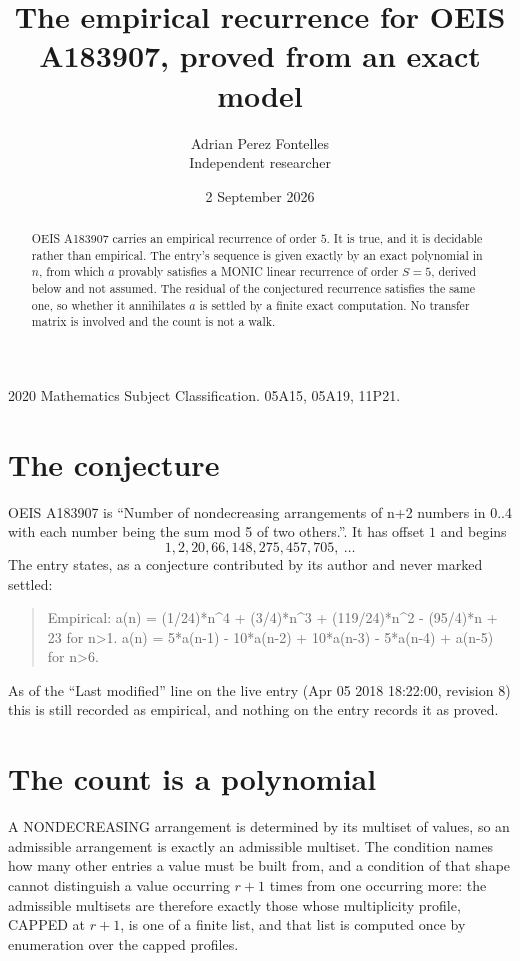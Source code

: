 \documentclass[11pt,a4paper]{article}
\title{The empirical recurrence for OEIS A183907, proved from an exact model}
\author{Adrian Perez Fontelles\\ \small Independent researcher}
\date{2 September 2026}
\theoremstyle{plain}
\theoremstyle{definition}
\begin{document}
\maketitle

\begin{abstract}
OEIS A183907 carries an empirical recurrence of order $5$. It is true, and it is
decidable rather than empirical. The entry's sequence is given exactly by an exact polynomial in $n$, from
which $a$ provably satisfies a MONIC linear recurrence of order $S=5$, derived below and not
assumed. The residual of the conjectured recurrence satisfies the same one, so whether it
annihilates $a$ is settled by a finite exact computation. No transfer matrix is involved and
the count is not a walk.
\end{abstract}

\noindent\small 2020 Mathematics Subject Classification. 05A15, 05A19, 11P21.\normalsize

\section{The conjecture}

OEIS A183907 is ``Number of nondecreasing arrangements of n+2 numbers in 0..4 with each number being the sum mod 5 of two others.''. It has offset $1$ and begins
\[
1, 2, 20, 66, 148, 275, 457, 705,\ \dots
\]
The entry states, as a conjecture contributed by its author and never marked settled:
\begin{quote}
Empirical: a(n) = (1/24)*n\^{}4 + (3/4)*n\^{}3 + (119/24)*n\^{}2 - (95/4)*n + 23 for n>1. a(n) = 5*a(n-1) - 10*a(n-2) + 10*a(n-3) - 5*a(n-4) + a(n-5) for n>6.
\end{quote}
As of the ``Last modified'' line on the live entry (Apr 05 2018 18:22:00, revision 8)
this is still recorded as empirical, and nothing on the entry records it as proved.

\section{The count is a polynomial}

A NONDECREASING arrangement is determined by its multiset of values, so an admissible
arrangement is exactly an admissible multiset. The condition names how many other entries a
value must be built from, and a condition of that shape cannot distinguish a value occurring
$r+1$ times from one occurring more: the admissible multisets are therefore exactly those
whose multiplicity profile, CAPPED at $r+1$, is one of a finite list, and that list is computed
once by enumeration over the capped profiles.
\end{document}
